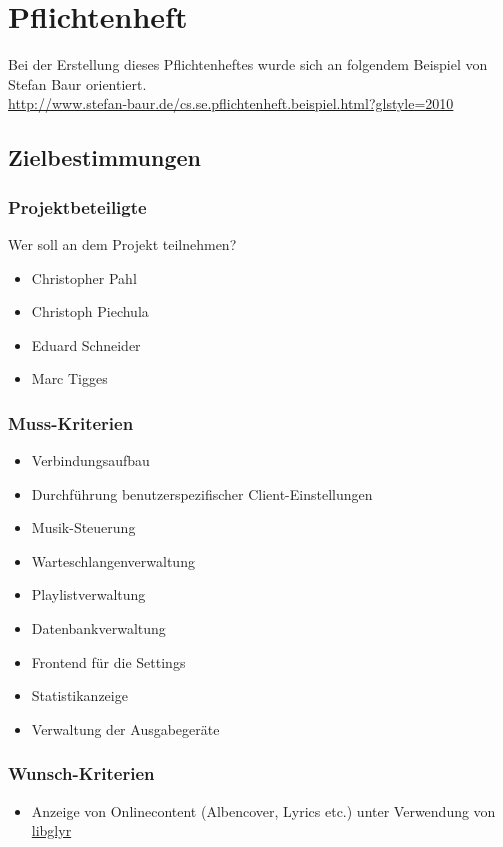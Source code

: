 \chapter{Pflichtenheft}
Bei der Erstellung dieses Pflichtenheftes wurde sich an folgendem Beispiel von Stefan Baur orientiert. \\
\url{http://www.stefan-baur.de/cs.se.pflichtenheft.beispiel.html?glstyle=2010}

\section{Zielbestimmungen}
\subsection{Projektbeteiligte}
Wer soll an dem Projekt teilnehmen?
\begin{itemize}
        \item Christopher Pahl
        \item Christoph Piechula
        \item Eduard Schneider
        \item Marc Tigges
\end{itemize}
\subsection{Muss-Kriterien}
\renewcommand{\labelitemi}{•}
\begin{itemize}
	\item Verbindungsaufbau
	\item Durchführung benutzerspezifischer Client-Einstellungen
	\item Musik-Steuerung
	\item Warteschlangenverwaltung
	\item Playlistverwaltung
	\item Datenbankverwaltung
	\item Frontend für die Settings
	\item Statistikanzeige
	\item Verwaltung der Ausgabegeräte
\end{itemize}
\subsection{Wunsch-Kriterien}
\begin{itemize}
    \item Anzeige von Onlinecontent (Albencover, Lyrics etc.) unter Verwendung von \href{https://github.com/sahib/glyr}{libglyr}
\end{itemize}

